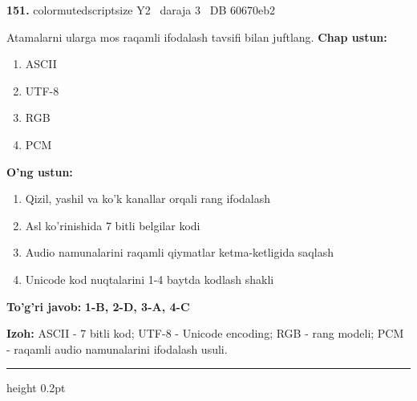 \documentclass[10pt,a4paper,oneside]{article}
\begin{document}
\noindent\textbf{\color{ink}151.}  {color{muted}scriptsize Y2 \textbullet\ daraja 3 \textbullet\ DB 60670eb2}
\par
Atamalarni ularga mos raqamli ifodalash tavsifi bilan juftlang.
\textbf{\footnotesize Chap ustun:}
\begin{enumerate}[label=\arabic*),leftmargin=9mm]
\item ASCII
\item UTF-8
\item RGB
\item PCM
\end{enumerate}
\textbf{\footnotesize O'ng ustun:}
\begin{enumerate}[label=\Alph*),leftmargin=9mm]
\item Qizil, yashil va ko'k kanallar orqali rang ifodalash
\item Asl ko'rinishida 7 bitli belgilar kodi
\item Audio namunalarini raqamli qiymatlar ketma-ketligida saqlash
\item Unicode kod nuqtalarini 1-4 baytda kodlash shakli
\end{enumerate}
\begin{tcolorbox}[enhanced,breakable,colback=teal!4,colframe=teal!50!black,boxrule=0.5pt,arc=1.1mm,left=3mm,right=3mm,top=1.7mm,bottom=1.7mm,before skip=2mm,after skip=2mm]
\textbf{\color{teal}To'g'ri javob:} \textbf{1-B, 2-D, 3-A, 4-C}
\par\smallskip
\textbf{Izoh:} ASCII - 7 bitli kod; UTF-8 - Unicode encoding; RGB - rang modeli; PCM - raqamli audio namunalarini ifodalash usuli.
\end{tcolorbox}
\vspace{2mm}\hrule height 0.2pt \vspace{3mm}
\end{document}
